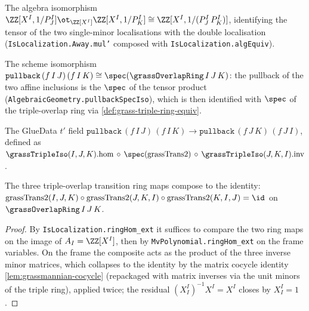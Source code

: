 \begin{definition}

  \label{def:grass-triple-ring-equiv}
  The algebra isomorphism $\ZZ[X^I,1/P^I_J]\ot_{\ZZ[X^I]}\ZZ[X^I,1/P^I_K]\cong
  \ZZ[X^I,1/(P^I_J\,P^I_K)]$, identifying the tensor of the two single-minor
  localisations with the double localisation (\texttt{IsLocalization.Away.mul'}
  composed with \texttt{IsLocalization.algEquiv}).
\end{definition}

\begin{definition}

  \label{def:grass-triple-iso}
  The scheme isomorphism $\mathtt{pullback}\,(f\,I\,J)\,(f\,I\,K)\cong
  \spec(\grassOverlapRing\,I\,J\,K)$: the pullback of the two affine inclusions is
  the $\spec$ of the tensor product (\texttt{AlgebraicGeometry.pullbackSpecIso}),
  which is then identified with $\spec$ of the triple-overlap ring via
  \cref{def:grass-triple-ring-equiv}.
\end{definition}

\begin{definition}

  \label{def:grass-trans-morphism2}
  The GlueData $t'$ field $\mathtt{pullback}\,(f\,I\,J)\,(f\,I\,K)\to
  \mathtt{pullback}\,(f\,J\,K)\,(f\,J\,I)$, defined as
  $\grassTripleIso(I,J,K).\mathrm{hom}\,\circ\,\spec(\mathrm{grassTrans2})\,\circ\,
  \grassTripleIso(J,K,I).\mathrm{inv}$.
\end{definition}

\begin{lemma}

  \label{lem:grass-trans2-cocycle}
  The three triple-overlap transition ring maps compose to the identity:
  $\mathrm{grassTrans2}(I,J,K)\circ\mathrm{grassTrans2}(J,K,I)\circ
  \mathrm{grassTrans2}(K,I,J)=\id$ on $\grassOverlapRing\,I\,J\,K$.
\end{lemma}
\begin{proof}
  By \texttt{IsLocalization.ringHom\_ext} it suffices to compare the two ring maps
  on the image of $A_I=\ZZ[X^I]$, then by \texttt{MvPolynomial.ringHom\_ext} on the
  frame variables. On the frame the composite acts as the product of the three
  inverse minor matrices, which collapses to the identity by the matrix cocycle
  identity \cref{lem:grassmannian-cocycle} (repackaged with matrix inverses via the
  unit minors of the triple ring), applied twice; the residual
  $(X^I_I)^{-1}X^I=X^I$ closes by $X^I_I=1$.
\end{proof}

